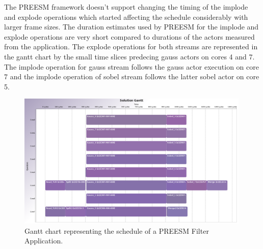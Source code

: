 The PREESM framework doesn't support changing the timing of the implode and explode operations which started affecting the schedule considerably with larger frame sizes. The duration estimates used by PREESM for the implode and explode operations are very short compared to durations of the actors measured from the application. The explode operations for both streams are represented in the gantt chart by the small time slices predecing gauss actors on cores 4 and 7. The implode operation for gauss stream follows the gauss actor execution on core 7 and the implode operation of sobel stream follows the latter sobel actor on core 5.

\begin{figure}[h!]
    \begin{center}
        \includegraphics[width=0.99\textwidth]{images/gantt_preesm_cifcif.png}
        \caption{Gantt chart representing the schedule of a PREESM Filter Application.}
        \label{fig:preesm_gantt}
    \end{center}
\end{figure}
